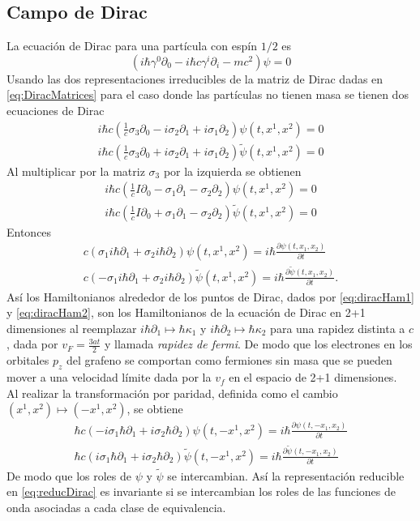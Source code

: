 \subsection{Campo de Dirac}
La ecuación de Dirac para una partícula con espín $1/2$ es
\begin{equation}
	(i\hbar\gamma^0\partial_0 - i\hbar c\gamma^i\partial_i -mc^2)\psi = 0
\end{equation}
Usando las dos representaciones irreducibles de la matriz de Dirac dadas en \eqref{eq:DiracMatrices} para el caso donde las partículas no tienen masa se tienen dos ecuaciones de Dirac
\begin{align}
	i\hbar c(\frac{1}{c}\sigma_3\partial_0 - i\sigma_2\partial_1 + i\sigma_1\partial_2)\psi(t,x^1,x^2) = 0 \\
	i\hbar c(\frac{1}{c}\sigma_3\partial_0 + i\sigma_2\partial_1 + i\sigma_1\partial_2) \widetilde{\psi}(t,x^1,x^2) = 0
\end{align}
Al multiplicar por la matriz $\sigma_3$ por la izquierda se obtienen
\begin{align}
	i\hbar c(\frac{1}{c}I\partial_0 - \sigma_1\partial_1 - \sigma_2\partial_2)\psi(t,x^1,x^2) = 0 \\
	i\hbar c(\frac{1}{c}I\partial_0 + \sigma_1\partial_1 - \sigma_2\partial_2) \widetilde{\psi}(t,x^1,x^2) = 0
\end{align}
Entonces
\begin{align}
	c(\sigma_1 i\hbar\partial_1 + \sigma_2 i\hbar\partial_2)\psi(t,x^1,x^2) = i\hbar\frac{\partial \psi(t,x_1,x_2)}{\partial t} \label{eq:dirac2+1a} \\
	c(-\sigma_1 i\hbar\partial_1 + \sigma_2 i\hbar\partial_2) \widetilde{\psi}(t,x^1,x^2) = i\hbar\frac{\partial \widetilde{\psi}(t,x_1,x_2)}{\partial t}.
\end{align}
Así los Hamiltonianos alrededor de los puntos de Dirac, dados por \eqref{eq:diracHam1} y \eqref{eq:diracHam2}, son los Hamiltonianos de la ecuación de Dirac en 2+1 dimensiones al reemplazar $i\hbar\partial_1\mapsto\hbar\kappa_1$ y $i\hbar\partial_2\mapsto\hbar\kappa_2$ para una rapidez distinta a $c$, dada por $v_F = \frac{3at}{2}$ y llamada \emph{rapidez de fermi}. De modo que los electrones en los orbitales $p_z$ del grafeno se comportan como fermiones sin masa que se pueden mover a una velocidad límite dada por la $v_f$ en el espacio de 2+1 dimensiones.\\
Al realizar la transformación por paridad, definida como el cambio $(x^1, x^2)\mapsto(-x^1,x^2)$, se obtiene
\begin{align}
	\hbar c(-i\sigma_1\hbar\partial_1 + i\sigma_2\hbar\partial_2)\psi(t,-x^1,x^2) = i\hbar\frac{\partial \psi(t,-x_1,x_2)}{\partial t}\label{eq:dirac2+1b} \\
	\hbar c(i\sigma_1\hbar\partial_1 + i\sigma_2\hbar\partial_2) \widetilde{\psi}(t,-x^1,x^2) = i\hbar\frac{\partial \widetilde{\psi}(t,-x_1,x_2)}{\partial t}
\end{align}
De modo que los roles de $\psi$ y $\widetilde{\psi}$ se intercambian. Así la representación reducible en \eqref{eq:reducDirac} es invariante si se intercambian los roles de las funciones de onda asociadas a cada clase de equivalencia.
